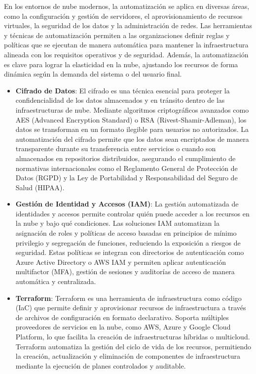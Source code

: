 {            En los entornos de nube modernos, la automatización se aplica en diversas áreas, como la configuración y gestión de servidores, el aprovisionamiento de recursos virtuales, la seguridad de los datos y la administración de redes. Las herramientas y técnicas de automatización permiten a las organizaciones definir reglas y políticas que se ejecutan de manera automática para mantener la infraestructura alineada con los requisitos operativos y de seguridad. Además, la automatización es clave para lograr la elasticidad en la nube, ajustando los recursos de forma dinámica según la demanda del sistema o del usuario final.
            
            \begin{itemize}
                \item \textbf{Cifrado de Datos}: El cifrado es una técnica esencial para proteger la confidencialidad de los datos almacenados y en tránsito dentro de las infraestructuras de nube. Mediante algoritmos criptográficos avanzados como AES (Advanced Encryption Standard) o RSA (Rivest-Shamir-Adleman), los datos se transforman en un formato ilegible para usuarios no autorizados. La automatización del cifrado permite que los datos sean encriptados de manera transparente durante su transferencia entre servicios o cuando son almacenados en repositorios distribuidos, asegurando el cumplimiento de normativas internacionales como el Reglamento General de Protección de Datos (RGPD) y la Ley de Portabilidad y Responsabilidad del Seguro de Salud (HIPAA).            
                \item \textbf{Gestión de Identidad y Accesos (IAM)}: La gestión automatizada de identidades y accesos permite controlar quién puede acceder a los recursos en la nube y bajo qué condiciones. Las soluciones IAM automatizan la asignación de roles y políticas de acceso basadas en principios de mínimo privilegio y segregación de funciones, reduciendo la exposición a riesgos de seguridad. Estas políticas se integran con directorios de autenticación como Azure Active Directory o AWS IAM y permiten aplicar autenticación multifactor (MFA), gestión de sesiones y auditorías de acceso de manera automática y centralizada.            
                \item \textbf{Terraform}: Terraform es una herramienta de infraestructura como código (IaC) que permite definir y aprovisionar recursos de infraestructura a través de archivos de configuración en formato declarativo. Soporta múltiples proveedores de servicios en la nube, como AWS, Azure y Google Cloud Platform, lo que facilita la creación de infraestructuras híbridas o multicloud. Terraform automatiza la gestión del ciclo de vida de los recursos, permitiendo la creación, actualización y eliminación de componentes de infraestructura mediante la ejecución de planes controlados y auditable.            

\end{itemize}}
